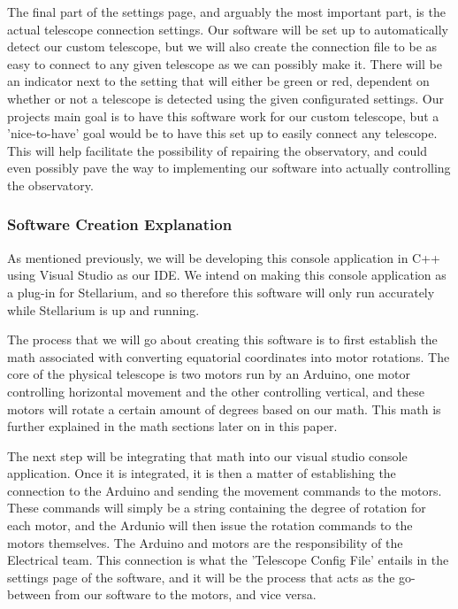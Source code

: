 \documentclass[12pt]{report}
\begin{document}
\newpage

The final part of the settings page, and arguably the most important part, is the actual telescope connection settings. Our software will be set up to automatically detect our custom telescope, but we will also create the connection file to be as easy to connect to any given telescope as we can possibly make it. There will be an indicator next to the setting that will either be green or red, dependent on whether or not a telescope is detected using the given configurated settings. Our projects main goal is to have this software work for our custom telescope, but a 'nice-to-have' goal would be to have this set up to easily connect any telescope. This will help facilitate the possibility of repairing the observatory, and could even possibly pave the way to implementing our software into actually controlling the observatory.


\subsubsection*{Software Creation Explanation}

As mentioned previously, we will be developing this console application in C++ using Visual Studio as our IDE. We intend on making this console application as a plug-in for Stellarium, and so therefore this software will only run accurately while Stellarium is up and running.

The process that we will go about creating this software is to first establish the math associated with converting equatorial coordinates into motor rotations. The core of the physical telescope is two motors run by an Arduino, one motor controlling horizontal movement and the other controlling vertical, and these motors will rotate a certain amount of degrees based on our math. This math is further explained in the math sections later on in this paper.

The next step will be integrating that math into our visual studio console application. Once it is integrated, it is then a matter of establishing the connection to the Arduino and sending the movement commands to the motors. These commands will simply be a string containing the degree of rotation for each motor, and the Ardunio will then issue the rotation commands to the motors themselves. The Arduino and motors are the responsibility of the Electrical team. This connection is what the 'Telescope Config File' entails in the settings page of the software, and it will be the process that acts as the go-between from our software to the motors, and vice versa.
\end{document}
